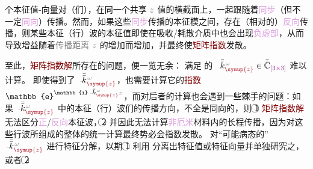 个\textcolor{PineGreen}{本征值}-\textcolor{PineGreen}{向量}对（们），在同一个共享 $\mathcolor{gray}{z}$ 值的横截面上，一起跟随着\textcolor{Plum}{同步}（但不一定\textcolor{Plum}{同向}）传播。然而，如果这些\textcolor{Plum}{同步}传播的\textcolor{PineGreen}{本征模}之间，存在（相对的）\textcolor{Plum}{反向}传播，则某些\textcolor{PineGreen}{本征（行）波}的\textcolor{PineGreen}{本征值}即使在\textcolor{NavyBlue}{吸收}/\textcolor{NavyBlue}{耗散}介质中也会出现\textcolor{Plum}{负虚部}，从而导致增益随着\textcolor{gray}{传播距离} $\mathcolor{gray}{z}$ 的增加而增加，并最终使\textcolor{Maroon}{矩阵指数}发散。

至此，\textcolor{Maroon}{矩阵指数解}所存在的问题，便一览无余：{\one} 满足  的 $\Xint{\begin{smallmatrix} ~ \\ {}^{}_{\mathcolor{gray}{-}} \\ ~ \end{smallmatrix}}{15}{\bar{\bar{k}}}_{\textcolor{Maroon}{\symup{z}}}^{\;\! \mathcolor{gray}{\omega}} \in \bar{\bar{\mathbb{C}}}_{\textcolor{Plum}{\left[3 \times 3\right]}}$ 难以计算\cite{sturmElectromagneticWavesCrystals2024}。{\two} 即使得到了 $\Xint{\begin{smallmatrix} ~ \\ {}^{}_{\mathcolor{gray}{-}} \\ ~ \end{smallmatrix}}{15}{\bar{\bar{k}}}_{\textcolor{Maroon}{\symup{z}}}^{\;\! \mathcolor{gray}{\omega}}$，也需要计算它的\textcolor{Maroon}{指数} $\mathbb{e}^{\mathbb{i} \Xint{\begin{smallmatrix} ~ \\ {}^{}_{\mathcolor{gray}{-}} \\ ~ \end{smallmatrix}}{15}{\bar{\bar{k}}}_{\textcolor{Maroon}{\symup{z}}}^{\;\! \mathcolor{gray}{\omega}} \mathcolor{gray}{z}}$，而对后者的计算也会遇到一些棘手的问题：如果 $\Xint{\begin{smallmatrix} ~ \\ {}^{}_{\mathcolor{gray}{-}} \\ ~ \end{smallmatrix}}{15}{\bar{\bar{k}}}_{\textcolor{Maroon}{\symup{z}}}^{\;\! \mathcolor{gray}{\omega}}$ 中的\textcolor{PineGreen}{本征（行）波}们的传播方向，不全是同向的，则 \textcircled{1} \textcolor{Maroon}{矩阵指数解}无法区分\textcolor{Plum}{正}/\textcolor{Plum}{反向}\textcolor{PineGreen}{本征波}，\textcircled{2} 并因此无法计算\textcolor{Plum}{非厄米}材料内的长程传播，因为对这些行波所组成的整体的统一计算最终势必会指数发散\cite{stallingaBerreman4x4Matrix1999}。{\three} 对“可能病态的” $\Xint{\begin{smallmatrix} ~ \\ {}^{}_{\mathcolor{gray}{-}} \\ ~ \end{smallmatrix}}{15}{\bar{\bar{k}}}_{\textcolor{Maroon}{\symup{z}}}^{\;\! \mathcolor{gray}{\omega}}$ 进行特征分解，以期 \textcircled{1} 利用  分离出\textcolor{PineGreen}{特征值}或\textcolor{PineGreen}{特征向量}并单独研究之，或者 \textcircled{2} 